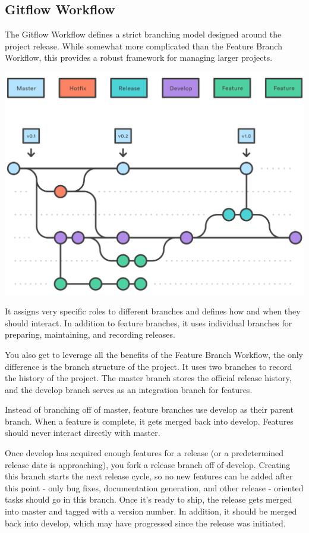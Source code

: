 \documentclass{article}
\begin{document}
\subsection{Gitflow Workflow}

The Gitflow Workflow defines a strict branching model designed around
the project release. While somewhat more complicated than the Feature
Branch Workflow, this provides a robust framework for managing larger
projects.

\begin{center}
\includegraphics[scale=0.5]{figures/16.pdf}
\end{center}

It assigns very specific roles to different branches and defines how
and when they should interact. In addition to feature branches, it
uses individual branches for preparing, maintaining, and recording
releases. 

You also get to leverage all the benefits of the Feature Branch
Workflow, the only difference is the branch structure of the project.
It uses two branches to record the history of the project. The master
branch stores the official release history, and the develop branch
serves as an integration branch for features.

Instead of branching off of master, feature branches use develop as
their parent branch. When a feature is complete, it gets merged back
into develop. Features should never interact directly with master.

Once develop has acquired enough features for a release (or a
predetermined release date is approaching), you fork a release branch
off of develop. Creating this branch starts the next release cycle, so
no new features can be added after this point - only bug fixes,
documentation generation, and other release - oriented tasks should go
in this branch. Once it's ready to ship, the release gets merged into
master and tagged with a version number. In addition, it should be
merged back into develop, which may have progressed since the release
was initiated.
\end{document}
